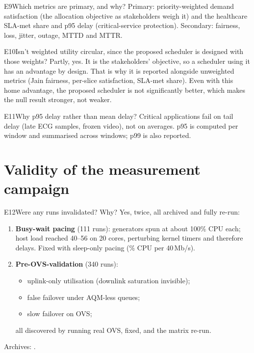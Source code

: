 \begin{qa}{E9}{Which metrics are primary, and why?}
Primary: priority-weighted demand satisfaction (the allocation objective as stakeholders weigh it) and the
healthcare SLA-met share and p95 delay (critical-service protection). Secondary: fairness, loss, jitter, outage, MTTD
and MTTR.
\end{qa}

\begin{qa}{E10}{Isn't weighted utility circular, since the proposed scheduler is designed with those weights?}
Partly, yes. It is the stakeholders' objective, so a scheduler using it has an advantage by design.
That is why it is reported alongside unweighted metrics (Jain fairness, per-slice satisfaction, SLA-met share). Even
with this home advantage, the proposed scheduler is not significantly better, which makes the null result stronger,
not weaker.
\end{qa}

\begin{qa}{E11}{Why p95 delay rather than mean delay?}
Critical applications fail on tail delay (late ECG samples, frozen video), not on averages. p95 is computed per window
and summarised across windows; p99 is also reported.
\end{qa}

\section{Validity of the measurement campaign}

\begin{qa}{E12}{Were any runs invalidated? Why?}
Yes, twice, all archived and fully re-run:
\begin{enumerate}
\item \textbf{Busy-wait pacing} (111 runs): generators spun at about 100\% CPU each; host load reached 40--56 on 20
cores, perturbing kernel timers and therefore delays. Fixed with sleep-only pacing (\NGenCpuAfter\% CPU per 40\,Mb/s).
\item \textbf{Pre-OVS-validation} (340 runs):
  \begin{itemize}
  \item uplink-only utilisation (downlink saturation invisible);
  \item false failover under AQM-less queues;
  \item slow failover on OVS;
  \end{itemize}
  all discovered by running real OVS, fixed, and the matrix re-run.
\end{enumerate}
Archives: .
\end{qa}

